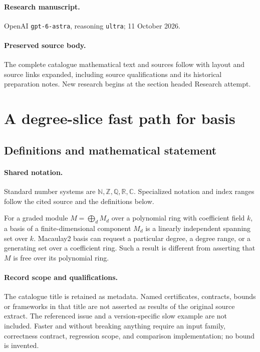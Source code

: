 \documentclass[11pt]{article}
\begin{document}
\paragraph{Research manuscript.} OpenAI \texttt{gpt-6-astra}, reasoning \texttt{ultra}; 11 October 2026.
\paragraph{Preserved source body.} The complete catalogue mathematical text and sources follow with layout and source links expanded, including source qualifications and its historical preparation notes. New research begins at the section headed Research attempt.

\section{A degree-slice fast path for basis}\label{statement}

\subsection{Definitions and mathematical statement}

\paragraph{Shared notation.}Standard number systems are $\mathbb N,\mathbb Z,\mathbb Q,\mathbb R,\mathbb C$. Specialized notation and index ranges follow the cited source and the definitions below.


For a graded module $M=\bigoplus_d M_d$ over a polynomial ring with coefficient field $k$, a basis of a finite-dimensional component $M_d$ is a linearly independent spanning set over $k$. Macaulay2 basis can request a particular degree, a degree range, or a generating set over a coefficient ring. Such a result is different from asserting that $M$ is free over its polynomial ring.
\paragraph{Record scope and qualifications.}
The catalogue title is retained as metadata. Named certificates, contracts, bounds or frameworks in that title are not asserted as results of the original source extract.
The referenced issue and a version-specific slow example are not included. Faster and without breaking anything require an input family, correctness contract, regression scope, and comparison implementation; no bound is invented.
\end{document}
